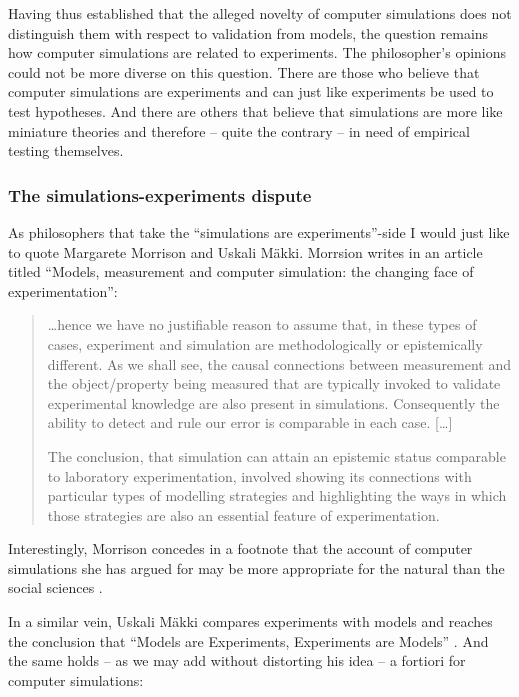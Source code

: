 \documentclass[onecollarge]{STJour}
\numberwithin{equation}{section}
\begin{document}
Having thus established that the alleged novelty of computer simulations
does not distinguish them with respect to validation from models, the
question remains how computer simulations are related to experiments.
The philosopher's opinions could not be more diverse on this question.
There are those who believe that computer simulations are experiments
and can just like experiments be used to test hypotheses. And there are
others that believe that simulations are more like miniature theories
and therefore -- quite the contrary -- in need of empirical testing
themselves.

\subsubsection{The simulations-experiments dispute}

As philosophers that take the ``simulations are experiments''-side I
would just like to quote Margarete Morrison and Uskali Mäkki. Morrsion
writes in an article titled ``Models, measurement and computer
simulation: the changing face of experimentation'':

\begin{quote}
\ldots hence we have no justifiable reason to assume that, in these types
of cases, experiment and simulation are methodologically or epistemically
different. As we shall see, the causal connections between measurement
and the object/property being measured that are typically invoked to
validate experimental knowledge are also present in simulations.
Consequently the ability to detect and rule our error is comparable in
each case. \citep[p.\ 43/44]{morrison:2009} [\ldots]

The conclusion, that simulation can attain an epistemic status comparable
to laboratory experimentation, involved showing its connections with
particular types of modelling strategies and highlighting the ways in
which those strategies are also an essential feature of experimentation.
\citep[p.\ 55/56]{morrison:2009}
\end{quote}
 
Interestingly, Morrison concedes in a footnote that the account of
computer simulations she has argued for may be more appropriate for the
natural than the social sciences \citep[p.\ 56, fn 33]{morrison:2009}. 

In a similar vein, Uskali Mäkki compares experiments with models and
reaches the conclusion that ``Models are Experiments, Experiments are
Models'' \citep{maeki:2005}. And the same holds -- as we may add without
distorting his idea -- a fortiori for computer simulations:
\end{document}
